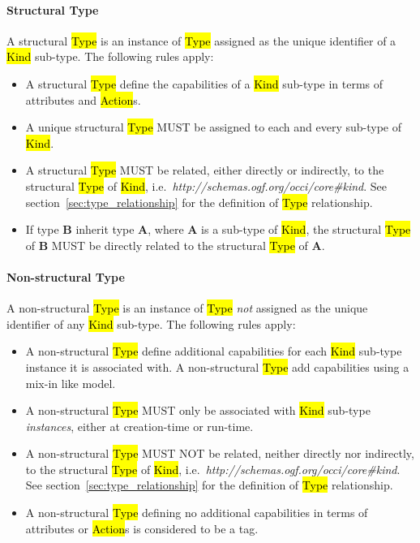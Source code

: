 \documentclass[10pt,a4paper,british]{article}
\begin{document}
\paragraph*{Structural Type}
A structural \hl{Type} is an instance of \hl{Type} assigned as the unique
identifier of a \hl{Kind} sub-type. The following rules apply:
\begin{itemize}
\item A structural \hl{Type} define the capabilities of a \hl{Kind} sub-type in terms of attributes and \hl{Action}s.
\item A unique structural \hl{Type} MUST be assigned to each and every sub-type
 of \hl{Kind}.
\item A structural \hl{Type} MUST be related, either directly or indirectly, to
 the structural \hl{Type} of \hl{Kind},
 i.e.~\textit{http://schemas.ogf.org/occi/core\#kind}.
 See section~\ref{sec:type_relationship} for the definition of \hl{Type}
 relationship.
\item If type {\bf B} inherit type {\bf A}, where {\bf A} is a sub-type of
 \hl{Kind}, the structural \hl{Type} of {\bf B} MUST be directly related to the
 structural \hl{Type} of {\bf A}.
\end{itemize}

\paragraph*{Non-structural Type} A non-structural \hl{Type} is an instance of
\hl{Type} {\em not} assigned as the unique identifier of any \hl{Kind} sub-type.
The following rules apply:
\begin{itemize}
\item A non-structural \hl{Type} define additional capabilities for each
 \hl{Kind} sub-type instance it is associated with. A non-structural \hl{Type}
 add capabilities using a mix-in like model.
\item A non-structural \hl{Type} MUST only be associated with \hl{Kind}
 sub-type {\em instances}, either at creation-time or run-time.
\item A non-structural \hl{Type} MUST NOT be related, neither directly nor
 indirectly, to the structural \hl{Type} of \hl{Kind},
 i.e.~\textit{http://schemas.ogf.org/occi/core\#kind}.
 See section~\ref{sec:type_relationship} for the definition of \hl{Type}
 relationship.
\item A non-structural \hl{Type} defining no additional capabilities in terms
 of attributes or \hl{Action}s is considered to be a tag.
\end{itemize}
\end{document}
